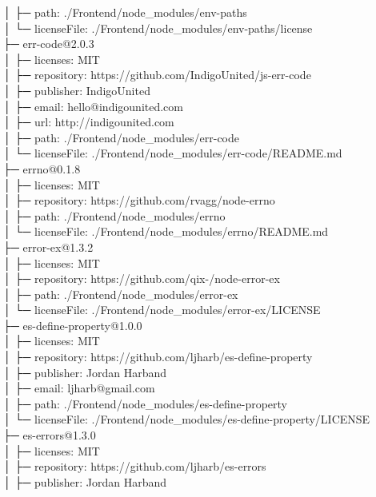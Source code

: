\documentclass[
    paper=a4,
    twoside=false,
    parskip=half,
    listof=entryprefix,
    listof=totoc,
    index=totoc,
    bibliography=totoc,
    headsepline,
]{scrbook}
\begin{document}
    │  ├─ path: ./Frontend/node\_modules/env-paths\\
    │  └─ licenseFile: ./Frontend/node\_modules/env-paths/license\\
    ├─ err-code@2.0.3\\
    │  ├─ licenses: MIT\\
    │  ├─ repository: https://github.com/IndigoUnited/js-err-code\\
    │  ├─ publisher: IndigoUnited\\
    │  ├─ email: hello@indigounited.com\\
    │  ├─ url: http://indigounited.com\\
    │  ├─ path: ./Frontend/node\_modules/err-code\\
    │  └─ licenseFile: ./Frontend/node\_modules/err-code/README.md\\
    ├─ errno@0.1.8\\
    │  ├─ licenses: MIT\\
    │  ├─ repository: https://github.com/rvagg/node-errno\\
    │  ├─ path: ./Frontend/node\_modules/errno\\
    │  └─ licenseFile: ./Frontend/node\_modules/errno/README.md\\
    ├─ error-ex@1.3.2\\
    │  ├─ licenses: MIT\\
    │  ├─ repository: https://github.com/qix-/node-error-ex\\
    │  ├─ path: ./Frontend/node\_modules/error-ex\\
    │  └─ licenseFile: ./Frontend/node\_modules/error-ex/LICENSE\\
    ├─ es-define-property@1.0.0\\
    │  ├─ licenses: MIT\\
    │  ├─ repository: https://github.com/ljharb/es-define-property\\
    │  ├─ publisher: Jordan Harband\\
    │  ├─ email: ljharb@gmail.com\\
    │  ├─ path: ./Frontend/node\_modules/es-define-property\\
    │  └─ licenseFile: ./Frontend/node\_modules/es-define-property/LICENSE\\
    ├─ es-errors@1.3.0\\
    │  ├─ licenses: MIT\\
    │  ├─ repository: https://github.com/ljharb/es-errors\\
    │  ├─ publisher: Jordan Harband\\
\end{document}
